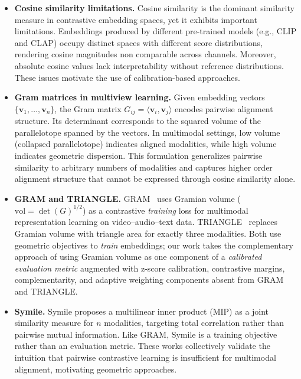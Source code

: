 \documentclass[a4paper,fleqn]{cas-sc}
\begin{document}
\begin{itemize}

\item \textbf{Cosine similarity limitations.}
Cosine similarity is the dominant similarity measure in contrastive embedding spaces, yet it exhibits important limitations. Embeddings produced by different pre-trained models (e.g., CLIP and CLAP) occupy distinct spaces with different score distributions, rendering cosine magnitudes non comparable across channels. Moreover, absolute cosine values lack interpretability without reference distributions. These issues motivate the use of calibration-based approaches.

\item \textbf{Gram matrices in multiview learning.}
Given embedding vectors $\{\mathbf{v}_1, \dots, \mathbf{v}_n\}$, the Gram matrix $G_{ij} = \langle \mathbf{v}_i, \mathbf{v}_j \rangle$ encodes pairwise alignment structure. Its determinant corresponds to the squared volume of the parallelotope spanned by the vectors. In multimodal settings, low volume (collapsed parallelotope) indicates aligned modalities, while high volume indicates geometric dispersion. This formulation generalizes pairwise similarity to arbitrary numbers of modalities and captures higher order alignment structure that cannot be expressed through cosine similarity alone.

\item \textbf{GRAM and TRIANGLE.}
GRAM~\citep{cicchetti2025gram} uses Gramian volume ({$\mathrm{vol} = \det(G)^{1/2}$}) as a contrastive \emph{training} loss for multimodal representation learning on video--audio--text data. TRIANGLE~\citep{cicchetti2025triangle} replaces Gramian volume with triangle area for exactly three modalities. Both use geometric objectives to \emph{train} embeddings; our work takes the complementary approach of using Gramian volume as one component of a \emph{calibrated evaluation metric} augmented with z-score calibration, contrastive margins, complementarity, and adaptive weighting components absent from GRAM and TRIANGLE.

\item \textbf{Symile.}
Symile \citep{saporta2024symile} proposes a multilinear inner product (MIP) as a joint similarity measure for $n$ modalities, targeting total correlation rather than pairwise mutual information. Like GRAM, Symile is a training objective rather than an evaluation metric. These works collectively validate the intuition that pairwise contrastive learning is insufficient for multimodal alignment, motivating geometric approaches.

\end{itemize}
\end{document}
